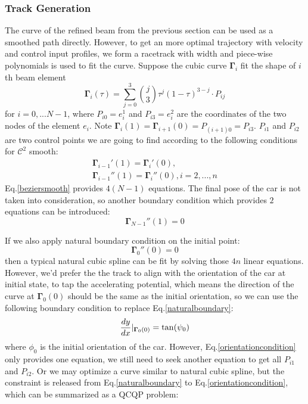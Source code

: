 \documentclass[conference, onecolumn]{IEEEtran}
\begin{document}
\subsubsection{Track Generation}\label{trackgeneration}
The curve of the refined beam from the previous section can be used as a smoothed path directly. However, to get an more optimal trajectory with velocity and control input profiles, we form a racetrack with width and piece-wise polynomials is used to fit the curve. Suppose the cubic curve $\mathbf{\Gamma}_i$ fit the shape of $i$th beam element\cite{prautzsch2002bezier}
\begin{equation}\label{cubic}
	\mathbf{\Gamma}_i(\tau)=\sum_{j = 0}^{3}\binom{j}{3}  \tau^j(1-\tau)^{3-j}\cdot P_{ij}
\end{equation}
for $i=0,...N-1$, where $P_{i0}=e^1_{i}$ and $P_{i3}=e^2_i$ are the coordinates of the two nodes of the element $e_i$. Note  $\mathbf{\Gamma}_{i}(1) =\mathbf{\Gamma}_{i+1}(0) = P_{(i+1)0}=P_{i3} $. $P_{i1}$ and $P_{i2}$ are two control points we are going to find according to the following conditions for $\mathcal{C} ^2$ smooth:
\begin{equation}\label{beziersmooth}
	\begin{array}{l}
		\mathbf{\Gamma}_{i-1}'(1)=\mathbf{\Gamma}_{i}'(0), \\
		\mathbf{\Gamma}_{i-1}''(1)=\mathbf{\Gamma}_{i}''(0), i=2,...,n
	\end{array}	
\end{equation}
Eq.\ref{beziersmooth} provides $4(N-1)$ equations.
The final pose of the car is not taken into consideration, so another boundary condition which provides $2$ equations can be introduced:
\begin{equation}\label{naturalboundaryend}
	\mathbf{\Gamma}_{N-1}''(1)=0
\end{equation}


If we also apply natural boundary condition on the initial point:
\begin{equation}\label{naturalboundary}
	\mathbf{\Gamma}_{0}''(0)=0
\end{equation}
then a typical natural cubic spline can be fit by solving those $4n$ linear equations. However, we'd prefer the the track to align with the orientation of the car at initial state, to tap the accelerating potential, which means the direction of the curve at $\mathbf{\Gamma}_{0}(0)$ should be the same as the initial orientation, so we can use the following boundary condition to replace Eq.\ref{naturalboundary}:
\begin{equation}\label{orientationcondition}
	\frac{dy}{dx} | _{\mathbf{\Gamma}_{0}(0)}=\tan(\psi_0)\\
\end{equation}
where $\phi_0$ is the initial orientation of the car.
However, Eq.\ref{orientationcondition} only provides one equation, we still need to seek another equation to get all $P_{i1}$ and $P_{i2}$. Or we may optimize a curve similar to natural cubic spline, but the constraint is released from Eq.\ref{naturalboundary} to Eq.\ref{orientationcondition}, which can be summarized as a QCQP problem:
\end{document}
